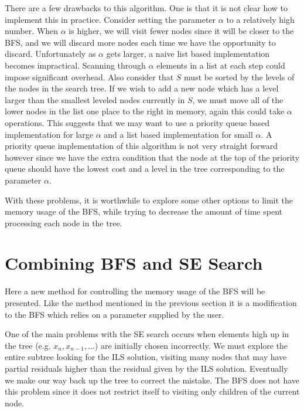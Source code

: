 \documentclass[12pt,Bold,letterpaper]{mcgilletdclass}
\newcommand{\vsp}{\vspace{\baselineskip}}
\begin{document}
There are a few drawbacks to this algorithm. One is that it is not clear how to implement this in practice. Consider setting the parameter $\alpha$ to a relatively high number. When $\alpha$ is higher, we will visit fewer nodes since it will be closer to the BFS, and we will discard more nodes each time we have the opportunity to discard. Unfortunately as $\alpha$ gets larger, a naive list based implementation becomes impractical. Scanning through $\alpha$ elements in a list at each step could impose significant overhead. Also consider that $S$ must be sorted by the levels of the nodes in the search tree. If we wish to add a new node which has a level larger than the smallest leveled nodes currently in $S$, we must move all of the lower nodes in the list one place to the right in memory, again this could take $\alpha$ operations. This suggests that we may want to use a priority queue based implementation for large $\alpha$ and a list based implementation for small $\alpha$. A priority queue implementation of this algorithm is not very straight forward however since we have the extra condition that the node at the top of the priority queue should have the lowest cost and a level in the tree corresponding to the parameter $\alpha$. 

With these problems, it is worthwhile to explore some other options to limit the memory usage of the BFS, while trying to decrease the amount of time spent processing each node in the tree.

\vsp \section{Combining BFS and SE Search}

Here a new method for controlling the memory usage of the BFS will be presented. Like the method mentioned in the previous section \cite{StuBF07} it is a modification to the BFS which relies on a parameter supplied by the user.

One of the main problems with the SE search occurs when elements high up in the tree (e.g. $x_n, x_{n-1} , \dots$) are initially chosen incorrectly. We must explore the entire subtree looking for the ILS solution, visiting many nodes that may have partial residuals higher than the residual given by the ILS solution. Eventually we make our way back up the tree to correct the mistake. The BFS does not have this problem since it does not restrict itself to visiting only children of the current node.
\end{document}
